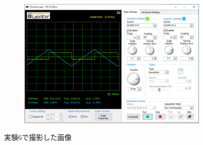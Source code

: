 \begin{figure}[!htb]
\begin{subfigure}{0.48\linewidth}
		\label{fig:exp6-int-res-tri}
	\end{subfigure}
	\begin{subfigure}{0.48\linewidth}
		\centering
		\includegraphics[width=0.8\linewidth]{src/figures/exp6/int-res-sq.png}
		\label{fig:exp6-int-res-sq}
	\end{subfigure}
	\caption{実験6で撮影した画像}\label{fig:exp6-raw}
\end{figure}
